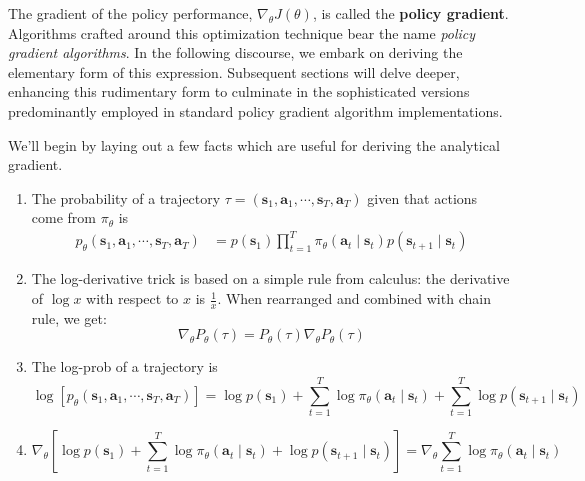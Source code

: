 The gradient of the policy performance, $\nabla_{\theta}J(\theta)$, is called the \textbf{policy gradient}. Algorithms crafted around this optimization technique bear the name \textit{policy gradient algorithms}. In the following discourse, we embark on deriving the elementary form of this expression. Subsequent sections will delve deeper, enhancing this rudimentary form to culminate in the sophisticated versions predominantly employed in standard policy gradient algorithm implementations.


We'll begin by laying out a few facts which are useful for deriving the analytical gradient.
\begin{enumerate}
    \item {} The probability of a trajectory $\tau = (\boldsymbol{s}_1, \boldsymbol{a}_1, \cdots ,\boldsymbol{s}_T, \boldsymbol{a}_T)$ given that actions come from $\pi_{\theta}$ is
    \begin{align*}
    p_{\theta}(\boldsymbol{s}_1, \boldsymbol{a}_1, \cdots ,\boldsymbol{s}_T, \boldsymbol{a}_T) &= p(\boldsymbol{s}_1) \prod_{t=1}^{T} \pi_{\theta}(\boldsymbol{a}_{t} \mid \boldsymbol{s}_t) p(\boldsymbol{s}_{t+1} \mid \boldsymbol{s}_t) 
    \end{align*}
    \item {} The log-derivative trick is based on a simple rule from calculus: the derivative of $\log x$ with respect to $x$ is $\frac{1}{x}$. When rearranged and combined with chain rule, we get:
    $$
    \nabla_{\theta} P_{\theta}(\tau) = P_{\theta}(\tau) \nabla_{\theta} P_{\theta}(\tau)
    $$
    \item {} The log-prob of a trajectory is 
        $$
        \log \left[ p_{\theta}(\boldsymbol{s}_1, \boldsymbol{a}_1, \cdots ,\boldsymbol{s}_T, \boldsymbol{a}_T) \right] = \log  p(\boldsymbol{s}_1) + \sum_{t=1}^{T} \log \pi_{\theta}(\boldsymbol{a}_{t} \mid \boldsymbol{s}_t) + \sum_{t=1}^{T} \log p(\boldsymbol{s}_{t+1} \mid \boldsymbol{s}_t)
        $$

    \item {}
        $$
        \nabla_{\theta} \left[ \log  p(\boldsymbol{s}_1) + \sum_{t=1}^{T} \log \pi_{\theta}(\boldsymbol{a}_{t} \mid \boldsymbol{s}_t) + \log p(\boldsymbol{s}_{t+1} \mid \boldsymbol{s}_t) \right] = \nabla_{\theta}   \sum_{t=1}^{T} \log \pi_{\theta}(\boldsymbol{a}_{t} \mid \boldsymbol{s}_t) 
        $$
\end{enumerate}


